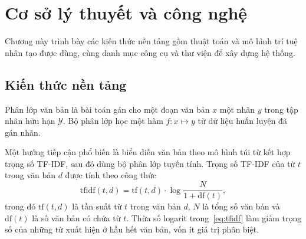 \chapter{Cơ sở lý thuyết và công nghệ}
\label{ch:coso}

\begin{muctieu}
Chương này trình bày các kiến thức nền tảng gồm thuật toán và mô hình trí
tuệ nhân tạo được dùng, cùng danh mục công cụ và thư viện để xây dựng hệ thống.
\end{muctieu}

\section{Kiến thức nền tảng}

\begin{chuy}
\end{chuy}

\begin{dinhnghia}
Phân lớp văn bản  là bài toán gán cho một đoạn văn
bản $x$ một nhãn $y$ trong tập nhãn hữu hạn $\mathcal{Y}$. Bộ phân lớp học
một hàm $f: x \mapsto y$ từ dữ liệu huấn luyện đã gán nhãn.
\end{dinhnghia}

\begin{mau}
Một hướng tiếp cận phổ biến là biểu diễn văn bản theo mô hình túi từ
 kết hợp trọng số TF-IDF, sau đó dùng bộ phân lớp tuyến
tính. Trọng số TF-IDF của từ $t$ trong văn bản $d$ được tính theo công thức
\begin{equation}
\mathrm{tfidf}(t, d) = \mathrm{tf}(t, d) \cdot \log\frac{N}{1 + \mathrm{df}(t)},
\label{eq:tfidf}
\end{equation}
trong đó $\mathrm{tf}(t,d)$ là tần suất từ $t$ trong văn bản $d$, $N$ là
tổng số văn bản và $\mathrm{df}(t)$ là số văn bản có chứa từ $t$. Thừa số
logarit trong~\eqref{eq:tfidf} làm giảm trọng số của những từ xuất hiện ở
hầu hết văn bản, vốn ít giá trị phân biệt.
\end{mau}

